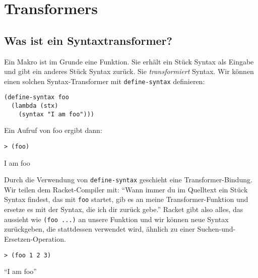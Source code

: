 \section{Transformers}
\subsection{Was ist ein Syntaxtransformer?}

Ein Makro ist im Grunde eine Funktion. Sie erhält ein Stück Syntax als Eingabe und gibt ein anderes Stück Syntax zurück. Sie \textit{transformiert} Syntax. Wir können einen solchen Syntax-Transformer mit \texttt{define-syntax} definieren:

\begin{lstlisting}
(define-syntax foo
  (lambda (stx)
    (syntax "I am foo")))
\end{lstlisting}

Ein Aufruf von foo ergibt dann:

\begin{lstlisting}
> (foo)
\end{lstlisting}
{\routput {\qq}I am foo{\qq}}

Durch die Verwendung von \texttt{define-syntax} geschieht eine Transformer-Bindung. Wir teilen dem Racket-Compiler mit: ``Wann immer du im Quelltext ein Stück Syntax findest, das mit \texttt{foo} startet, gib es an meine Transformer-Funktion und ersetze es mit der Syntax, die ich dir zurück gebe.'' Racket gibt also alles, das aussieht wie \texttt{(foo ...)} an unsere Funktion und wir können neue Syntax zurückgeben, die stattdessen verwendet wird, ähnlich zu einer Suchen-und-Ersetzen-Operation.

\begin{lstlisting}
> (foo 1 2 3)
\end{lstlisting}
{\routput ``I am foo''}


%   
% 

%   

